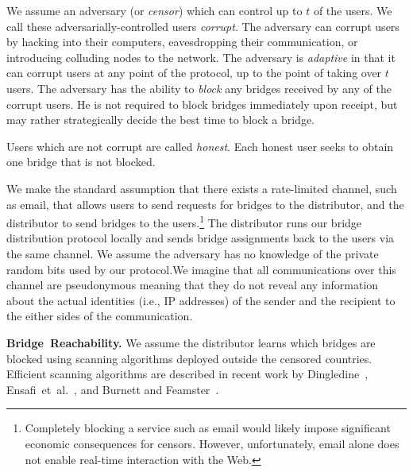 \documentclass[letterpaper,twocolumn,10pt]{article}
\newcommand{\fullpaper}[1]{#1}
\newcommand{\fullpaper}[1]{}
\newcommand{\etal}{et~al.}
\newcommand{\sfsize}{\fontsize{0.73\baselineskip}{0.73\baselineskip}\selectfont}
\newcommand{\sans}[1]{\textsf{\sfsize \mbox{#1}}}
\newcommand{\sansb}[1]{\textbf{\sans{\mbox{#1}}}}
\newcommand{\para}[1]{\vspace{0.55em} \noindent \sansb{{\mbox{#1}}}}
\begin{document}
We assume an adversary (or \emph{censor}) which can control up to $t$ of the users.  We call these adversarially-controlled users \emph{corrupt}. \fullpaper{The adversary can corrupt users by hacking into their computers, eavesdropping their communication, or introducing colluding nodes to the network.}
The adversary is \emph{adaptive} in that it can corrupt users at any point of the protocol, up to the point of taking over $t$ users.  The adversary has the ability to \emph{block} any bridges received by any of the corrupt users.  He is not required to block bridges immediately upon receipt, but may rather strategically decide the best time to block a bridge.

Users which are not corrupt are called \emph{honest}. Each honest user seeks to obtain  one bridge that is not blocked.  

We make the standard assumption that there exists a rate-limited channel, such as email, that allows users to send requests for bridges to the distributor, and the distributor to send bridges to the users.\footnote{Completely blocking a service such as email would likely impose significant economic consequences for censors.  However, unfortunately, email alone does not enable real-time interaction with the Web.} The distributor runs our bridge distribution protocol locally and sends bridge assignments back to the users via the same channel. We assume the adversary has no knowledge of the private random bits used by our protocol.\fullpaper{We imagine that all communications over this channel are pseudonymous meaning that they do not reveal any information about the actual identities (i.e., IP addresses) of the sender and the recipient to the either sides of the communication.}

\para{Bridge Reachability.}  We assume the distributor learns which bridges are blocked using scanning algorithms deployed outside the censored countries.  Efficient scanning algorithms are described in recent work by Dingledine~\cite{Dingledine:BridgeReach:2011}, Ensafi~\etal~\cite{Ensafi:2014:PAM}, and Burnett and Feamster~\cite{Burnett:2015:ELM}. 
\end{document}
